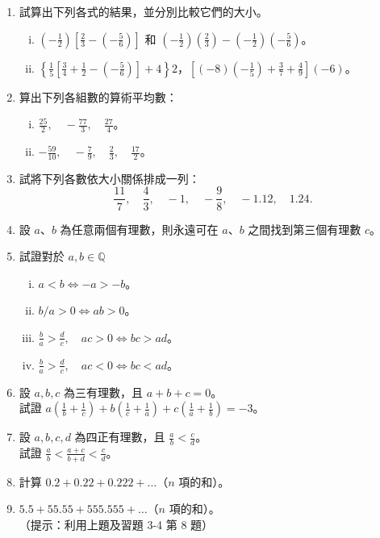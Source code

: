 \begin{enumerate}[1., leftmargin=2em]
  \item 試算出下列各式的結果，並分別比較它們的大小。
  \begin{enumerate}[(i)]
    \item $\left(-\frac{1}{2}\right)\left[\frac{2}{3} - \left(-\frac{5}{6}\right)\right]$ 和 $\left(-\frac{1}{2}\right)\left(\frac{2}{3}\right) - \left(-\frac{1}{2}\right)\left(-\frac{5}{6}\right)$。
    \item $\left\{\frac{1}{5}\left[\frac{3}{4} + \frac{1}{2} - \left(-\frac{5}{6}\right)\right] + 4\right\} 2$，$\left[(-8)\left(-\frac{1}{5}\right) + \frac{3}{7} + \frac{4}{9}\right](-6)$。
  \end{enumerate}
  \item 算出下列各組數的算術平均數：
  \begin{enumerate}[(i)]
    \item $\frac{25}{2}, \quad -\frac{77}{3}, \quad \frac{27}{4}$。
    \item $-\frac{59}{10}, \quad -\frac{7}{9}, \quad \frac{2}{3}, \quad \frac{17}{2}$。
  \end{enumerate}
  \item 試將下列各數依大小關係排成一列：
  \begin{equation*}
    \frac{11}{7}, \quad \frac{4}{3}, \quad -1, \quad -\frac{9}{8}, \quad -1.12, \quad 1.24.
  \end{equation*}
  \item 設 $a$、$b$ 為任意兩個有理數，則永遠可在 $a$、$b$ 之間找到第三個有理數 $c$。
  \item 試證對於 $a, b \in \mathbb{Q}$
  \begin{enumerate}[(i)]
    \item $a < b \iff -a > -b$。
    \item $b/a > 0 \iff ab > 0$。
    \item $\frac{b}{a} > \frac{d}{c}, \quad ac > 0 \iff bc > ad$。
    \item $\frac{b}{a} > \frac{d}{c}, \quad ac < 0 \iff bc < ad$。
  \end{enumerate}
  \item 設 $a, b, c$ 為三有理數，且 $a+b+c=0$。\\
  試證 $a\left(\frac{1}{b} + \frac{1}{c}\right) + b\left(\frac{1}{c} + \frac{1}{a}\right) + c\left(\frac{1}{a} + \frac{1}{b}\right) = -3$。
  \item 設 $a, b, c, d$ 為四正有理數，且 $\frac{a}{b} < \frac{c}{d}$。\\
  試證 $\frac{a}{b} < \frac{a+c}{b+d} < \frac{c}{d}$。
  \item 計算 $0.2+0.22+0.222+\dots$（$n$ 項的和）。
  \item $5.5+55.55+555.555+\dots$（$n$ 項的和）。\\
  （提示：利用上題及習題 3-4 第 8 題）
\end{enumerate}


